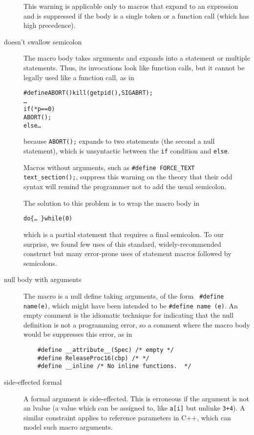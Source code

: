 \documentclass[10pt]{article}
\begin{document}
\begin{description}
        This warning is applicable only to macros that expand to an
        expression and is suppressed if the body is a single token or a
        function call (which has high precedence).

\item[doesn't swallow semicolon]\label{item:swallow-semicolon}
        The macro body takes arguments and expands into a statement or
        multiple statements.  Thus, its invocations look like function
        calls, but it cannot be legally used like a function call, as in
\begin{alltt}
    #define ABORT() kill(getpid(),SIGABRT);
    \ldots
    if (*p == 0)
      ABORT();
    else \ldots
\end{alltt}
        because {\tt ABORT();} expands to two statements (the second a null
        statement), which is unsyntactic between the {\tt if} condition and
        {\tt else}.

        Macros without arguments, such as {\tt \#define \verb|FORCE_TEXT|
        \verb|text_section|();}, suppress this warning on the theory that their
        odd syntax will remind the programmer not to add the usual semicolon.

        The solution to this problem is to wrap the macro body in
\begin{alltt}
             do \verb|{| \ldots\ \verb|}| while (0)
\end{alltt}
        which is a partial statement that requires a final semicolon.  To
        our surprise, we found few uses of this standard, widely-recommended
        construct but many error-prone uses of statement macros followed by
        semicolons.

\item[null body with arguments]
        The macro is a null define taking arguments, of the form {\tt
        \#define name(e)},
        which might have been intended to be {\tt \#define name (e)}.
        An empty comment is the idiomatic technique for indicating that the
        null definition is not a programming error, so a comment where the macro
        body would be suppresses this error, as in
\begin{verbatim}
    #define __attribute__(Spec) /* empty */
    #define ReleaseProc16(cbp) /* */
    #define __inline /* No inline functions.  */
\end{verbatim}

\item[side-effected formal]
        A formal argument is side-effected.  This is erroneous if the
        argument is not an lvalue (a value which can be assigned to, like
        {\tt a[i]} but unlinke {\tt 3+4}).  A similar constraint applies to
        reference parameters in C++, which can model such macro arguments.


\end{description}
\end{document}
